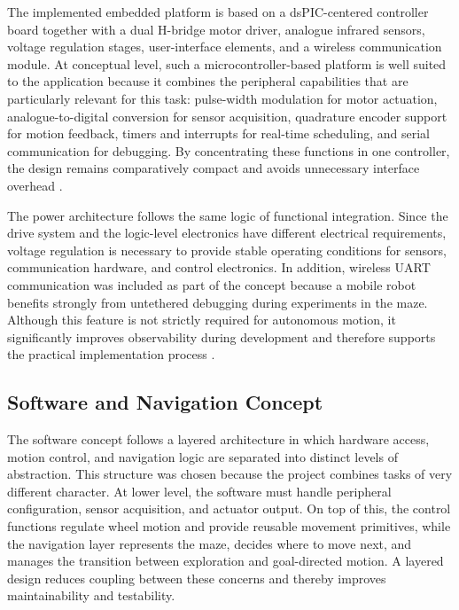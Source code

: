 The implemented embedded platform is based on a dsPIC-centered controller board together with a dual H-bridge motor driver, analogue infrared sensors, voltage regulation stages, user-interface elements, and a wireless communication module. At conceptual level, such a microcontroller-based platform is well suited to the application because it combines the peripheral capabilities that are particularly relevant for this task: pulse-width modulation for motor actuation, analogue-to-digital conversion for sensor acquisition, quadrature encoder support for motion feedback, timers and interrupts for real-time scheduling, and serial communication for debugging. By concentrating these functions in one controller, the design remains comparatively compact and avoids unnecessary interface overhead \cite{datasheet_dspic}.

The power architecture follows the same logic of functional integration. Since the drive system and the logic-level electronics have different electrical requirements, voltage regulation is necessary to provide stable operating conditions for sensors, communication hardware, and control electronics. In addition, wireless UART communication was included as part of the concept because a mobile robot benefits strongly from untethered debugging during experiments in the maze. Although this feature is not strictly required for autonomous motion, it significantly improves observability during development and therefore supports the practical implementation process \cite{datasheet_bluetooth}.

\subsection{Software and Navigation Concept}

The software concept follows a layered architecture in which hardware access, motion control, and navigation logic are separated into distinct levels of abstraction. This structure was chosen because the project combines tasks of very different character. At lower level, the software must handle peripheral configuration, sensor acquisition, and actuator output. On top of this, the control functions regulate wheel motion and provide reusable movement primitives, while the navigation layer represents the maze, decides where to move next, and manages the transition between exploration and goal-directed motion. A layered design reduces coupling between these concerns and thereby improves maintainability and testability.

